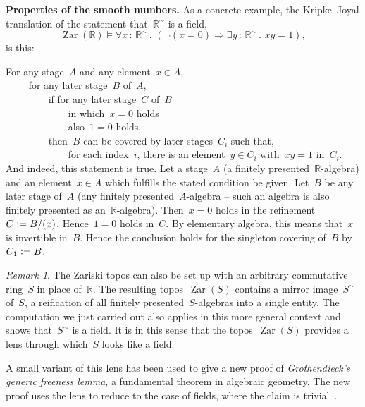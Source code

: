 \documentclass[oneside,reqno]{amsart}
\theoremstyle{definition}
\theoremstyle{plain}
\theoremstyle{remark}
\newtheorem{rem}[defn]{Remark}
\newenvironment{indentblock}{%
  \list{}{\leftmargin\leftmargin}%
  \item\relax
}{%
  \endlist
}
\newcommand{\RR}{\mathbb{R}}
\newcommand{\defeq}{\vcentcolon=}
\DeclareMathOperator{\Zar}{Zar}
\renewcommand{\_}{\mathpunct{.}\,}
\newcommand{\?}{\,{:}\,}
\renewcommand{\paragraph}[1]{\noindent\textbf{#1.}}
\begin{document}
\paragraph{Properties of the smooth numbers}\label{page:field-property}
As a concrete example, the Kripke--Joyal translation of the statement that~$\RR^\sim$ is a field,
\[ \Zar(\RR) \models \forall x\?\RR^\sim\_ (\neg(x = 0) \Rightarrow \exists y\?\RR^\sim\_ xy = 1), \]
is this:
\begin{indentblock}
For any stage~$A$ and any element~$x \in A$, \\
${\qquad}$ for any later stage~$B$ of~$A$, \\
${\qquad\qquad}$ if for any later stage~$C$ of~$B$ \\
${\qquad\qquad\qquad}$ in which~$x = 0$ holds \\
${\qquad\qquad\qquad}$ also~$1 = 0$ holds, \\
${\qquad\qquad}$ then~$B$ can be covered by later stages~$C_i$ such that, \\
${\qquad\qquad\qquad}$ for each
index~$i$, there is an element~$y \in C_i$ with~$xy = 1$ in~$C_i$.
\end{indentblock}
And indeed, this statement is true. Let a stage~$A$ (a finitely
presented~$\RR$-algebra) and an element~$x \in A$ which fulfills the stated
condition be given. Let~$B$ be any later stage of~$A$ (any finitely
presented~$A$-algebra -- such an algebra is also finitely presented as
an~$\RR$-algebra). Then~$x = 0$ holds in the refinement~$C \defeq B/(x)$.
Hence~$1 = 0$ holds in~$C$. By elementary algebra, this means that~$x$ is
invertible in~$B$. Hence the conclusion holds for the singleton covering
of~$B$ by~$C_1 \defeq B$.

\begin{rem}The Zariski topos can also be set up with an arbitrary commutative
ring~$S$ in place of~$\RR$. The resulting topos~$\Zar(S)$ contains a mirror
image~$S^\sim$ of~$S$, a reification of all finitely presented~$S$-algebras into a
single entity. The computation we just carried out also applies in this
more general context and shows that~$S^\sim$ is a field. It is in this sense that the
topos~$\Zar(S)$ provides a lens through which~$S$ looks like a field.

A small variant of this lens has been used to give a new proof of
\emph{Grothendieck's generic freeness lemma}, a fundamental theorem in
algebraic geometry. The new proof uses the lens to reduce to the case
of fields, where the claim is trivial~\cite[Section~11.5]{blechschmidt:phd}.
\end{rem}
\end{document}
